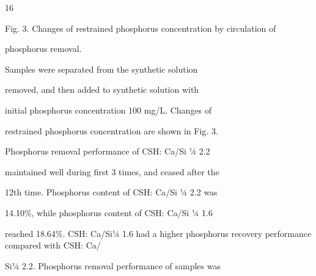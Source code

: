 \documentclass[a4paper,portrait,12pt]{article}
\begin{document}
16





\begin{flushleft}
Fig. 3. Changes of restrained phosphorus concentration by circulation of
\end{flushleft}


\begin{flushleft}
phosphorus removal.
\end{flushleft}





\begin{flushleft}
Samples were separated from the synthetic solution
\end{flushleft}


\begin{flushleft}
removed, and then added to synthetic solution with
\end{flushleft}


\begin{flushleft}
initial phosphorus concentration 100 mg/L. Changes of
\end{flushleft}


\begin{flushleft}
restrained phosphorus concentration are shown in Fig. 3.
\end{flushleft}


\begin{flushleft}
Phosphorus removal performance of CSH: Ca/Si ¼ 2.2
\end{flushleft}


\begin{flushleft}
maintained well during ﬁrst 3 times, and ceased after the
\end{flushleft}


\begin{flushleft}
12th time. Phosphorus content of CSH: Ca/Si ¼ 2.2 was
\end{flushleft}


\begin{flushleft}
14.10\%, while phosphorus content of CSH: Ca/Si ¼ 1.6
\end{flushleft}


\begin{flushleft}
reached 18.64\%. CSH: Ca/Si¼ 1.6 had a higher phosphorus recovery performance compared with CSH: Ca/
\end{flushleft}


\begin{flushleft}
Si¼ 2.2. Phosphorus removal performance of samples was
\end{flushleft}
\end{document}
